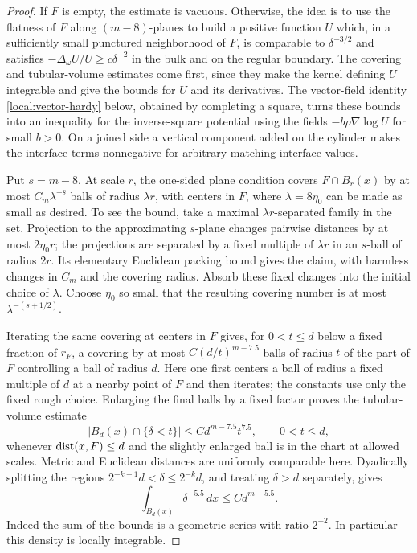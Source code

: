 \begin{proof}
If $F$ is empty, the estimate is vacuous. Otherwise, the idea is to use
the flatness of $F$ along $(m-8)$-planes to build a positive function $U$
which, in a sufficiently small punctured neighborhood of $F$, is
comparable to $\delta^{-3/2}$ and satisfies
$-\Delta_\omega U/U\ge c\delta^{-2}$ in the bulk and on the regular
boundary. The covering and tubular-volume estimates come first, since
they make the kernel defining $U$ integrable and give the bounds for
$U$ and its derivatives.
The vector-field identity \eqref{local:vector-hardy} below, obtained
by completing a square, turns these bounds into an inequality for the inverse-square potential
using the fields $-b\rho\nabla\log U$ for small $b>0$. On a joined
side a vertical component added on the cylinder makes the interface terms
nonnegative for arbitrary matching interface values.

Put $s=m-8$.  At scale $r$, the one-sided plane condition covers
$F\cap B_r(x)$ by at most $C_m\lambda^{-s}$ balls of radius
$\lambda r$, with centers in $F$, where $\lambda=8\eta_0$ can be
made as small as desired.  To see the bound, take a maximal
$\lambda r$-separated family in the set.  Projection to the
approximating $s$-plane changes pairwise distances by at most
$2\eta_0r$; the projections are separated by a fixed multiple of
$\lambda r$ in an $s$-ball of radius $2r$.  Its elementary Euclidean
packing bound gives the claim, with harmless changes in $C_m$ and
the covering radius.  Absorb these fixed changes into the initial
choice of $\lambda$.  Choose $\eta_0$ so small that the resulting
covering number is at most $\lambda^{-(s+1/2)}$.

Iterating the same covering at centers in $F$ gives, for $0<t\le d$
below a fixed fraction of $r_F$, a covering by at most
$C(d/t)^{m-7.5}$ balls of radius $t$ of the part of $F$ controlling a
ball of radius $d$.  Here one first centers a ball of radius a fixed
multiple of $d$ at a nearby point of $F$ and then iterates; the
constants use only the fixed rough choice.  Enlarging the final
balls by a fixed factor proves the tubular-volume estimate
\begin{equation}\label{local:tube-volume}
 |B_d(x)\cap\{\delta<t\}|
       \le C d^{m-7.5}t^{7.5},\qquad 0<t\le d,
\end{equation}
whenever $\operatorname{dist}(x,F)\le d$ and the slightly enlarged ball is in the
chart at allowed scales.  Metric and Euclidean distances are
uniformly comparable here.  Dyadically splitting the regions
$2^{-k-1}d<\delta\le2^{-k}d$, and treating $\delta>d$ separately,
gives
\begin{equation}\label{local:density-integral}
 \int_{B_d(x)}\delta^{-5.5}\,dx\le C d^{m-5.5}.
\end{equation}
Indeed the sum of the bounds is a geometric series with ratio
$2^{-2}$.  In particular this density is locally integrable.


\end{proof}
